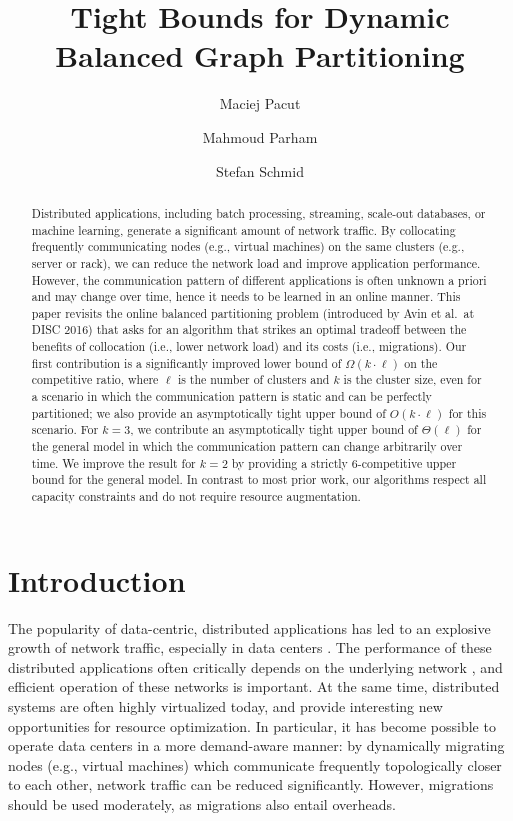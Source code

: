 \documentclass[a4paper,anonymous,USenglish]{lipics-v2019}
\title{Tight Bounds for Dynamic Balanced Graph Partitioning}
\author{Maciej Pacut}{maciej.pacut@univie.ac.at}{Faculty of Computer Science, University of Vienna,Austria}{0000-0002-6379-1490}{}
\author{Mahmoud Parham}{mahmoud.parham@univie.ac.at}{Faculty of Computer Science, University of Vienna, Austria}{0000-0002-6211-077X}{}
\author{Stefan Schmid}{stefan\_schmid@univie.ac.at}{Faculty of Computer Science, University of Vienna, Austria}{}{}
\begin{document}
\begin{abstract}
	Distributed   applications,  including  batch  processing, streaming, scale-out databases,
	or machine learning, generate a significant amount of network traffic.
	By collocating frequently communicating nodes (e.g., virtual machines) on the same clusters (e.g., server or rack), we can reduce the network load and  improve application performance. 
	However, the communication pattern of different applications is often unknown a priori and may change over time, hence it needs to be learned in an online manner.
	This paper revisits the online 
	balanced partitioning problem 
	(introduced by Avin et al.~at DISC 2016)
	that asks for an algorithm that strikes
	an optimal tradeoff between the benefits
	of collocation (i.e., lower network load) 
	and its costs (i.e., migrations). 
	Our first contribution is a significantly improved
	lower bound of $\Omega(k\cdot \ell)$ on the
	competitive ratio, where $\ell$ is the number
	of clusters and $k$ is the cluster size,
	even for a scenario in which the communication
	pattern is static and can be perfectly partitioned;
	we also provide an asymptotically tight upper bound 
	of $O(k\cdot \ell)$ for this scenario.
	For $k=3$, we contribute an asymptotically tight upper bound
	of $\Theta(\ell)$
	for the general model in which the
	communication pattern can change arbitrarily over time.
	We improve the result for $k=2$ by providing a strictly $6$-competitive upper bound for the general model.
	In contrast to most prior work, our algorithms respect all capacity constraints and do not require resource augmentation.
	
\end{abstract}

\maketitle



\section{Introduction}

The popularity of data-centric, distributed applications has led to an explosive growth of network traffic, especially in data centers \cite{roy2015inside,singh2015jupiter}.
The performance of these distributed applications often critically depends on the underlying network \cite{mogul2012we}, and efficient operation of these networks is important.
At the same time, distributed systems are often highly virtualized today, and provide interesting new opportunities for resource optimization.
In particular, it has become possible to operate data centers in a more demand-aware manner: 
by dynamically migrating nodes (e.g., virtual machines) which communicate frequently topologically closer to each other, network traffic can be reduced significantly.  
However, migrations should be used moderately, as migrations also entail overheads. 
\end{document}
